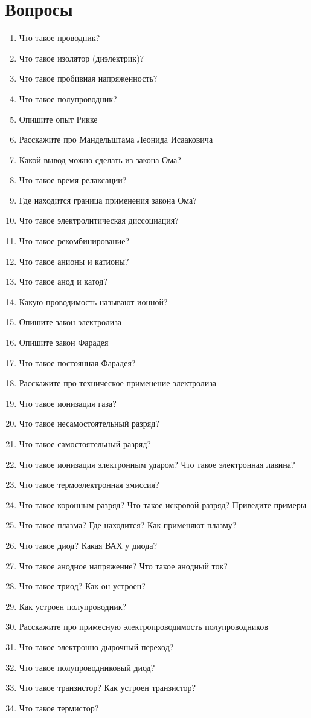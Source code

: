 \documentclass[12pt,a4paper]{report}
\begin{document}
\section{Вопросы}
\begin{enumerate}
\item Что такое проводник?
\item Что такое изолятор (диэлектрик)?
\item Что такое пробивная напряженность?
\item Что такое полупроводник?
\item Опишите опыт Рикке
\item Расскажите про Мандельштама Леонида Исааковича
\item Какой вывод можно сделать из закона Ома?
\item Что такое время релаксации?
\item Где находится граница применения закона Ома?
\item Что такое электролитическая диссоциация?
\item Что такое рекомбинирование?
\item Что такое анионы и катионы?
\item Что такое анод и катод?
\item Какую проводимость называют ионной?
\item Опишите закон электролиза
\item Опишите закон Фарадея
\item Что такое постоянная Фарадея?
\item Расскажите про техническое применение электролиза
\item Что такое ионизация газа?
\item Что такое несамостоятельный разряд?
\item Что такое самостоятельный разряд?
\item Что такое ионизация электронным ударом? Что такое электронная лавина?
\item Что такое термоэлектронная эмиссия?
\item Что такое коронным разряд? Что такое искровой разряд? Приведите примеры
\item Что такое плазма? Где находится? Как применяют плазму?
\item Что такое диод? Какая ВАХ у диода?
\item Что такое анодное напряжение? Что такое анодный ток?
\item Что такое триод? Как он устроен?
\item Как устроен полупроводник?
\item Расскажите про примесную электропроводимость полупроводников
\item Что такое электронно-дырочный переход?
\item Что такое полупроводниковый диод?
\item Что такое транзистор? Как устроен транзистор?
\item Что такое термистор?
\end{enumerate}
\end{document}
